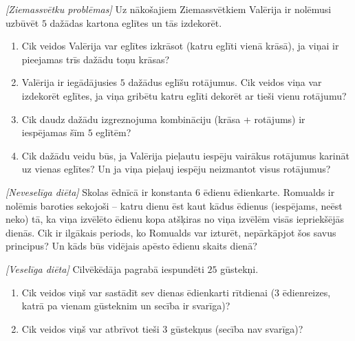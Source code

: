 



\renewcommand{\theenumi}{\alph{enumi}}



\noindent 

\begin{problem}
\textit{[Ziemassvētku problēmas]}
Uz nākošajiem Ziemassvētkiem Valērija ir nolēmusi uzbūvēt $5$ dažādas kartona eglītes un tās izdekorēt.
\begin{enumerate}
\item Cik veidos Valērija var eglītes izkrāsot (katru eglīti vienā krāsā), ja viņai ir pieejamas trīs dažādu toņu krāsas?
\item Valērija ir iegādājusies $5$ dažādus eglīšu rotājumus. Cik veidos viņa var izdekorēt eglītes, ja viņa gribētu katru eglīti dekorēt ar tieši vienu rotājumu?
\item Cik daudz dažādu izgreznojuma kombināciju (krāsa + rotājums) ir iespējamas šīm $5$ eglītēm?
\item Cik dažādu veidu būs, ja Valērija pieļautu iespēju vairākus rotājumus karināt uz vienas eglītes? Un ja viņa pieļauj iespēju neizmantot visus rotājumus?
\end{enumerate}
\end{problem}
%

\begin{problem}
\textit{[Neveselīga diēta]}
Skolas ēdnīcā ir konstanta $6$ ēdienu ēdienkarte. Romualds ir nolēmis baroties sekojoši – katru dienu ēst kaut kādus ēdienus (iespējams, neēst neko) tā, ka viņa izvēlēto ēdienu kopa atšķiras no viņa izvēlēm visās iepriekšējās dienās. 
Cik ir ilgākais periods, ko Romualds var izturēt, nepārkāpjot šos savus principus? Un kāds būs vidējais apēsto ēdienu skaits dienā?
\end{problem}
%

\begin{problem}
\textit{[Veselīga diēta]}
Cilvēkēdāja pagrabā iespundēti $25$ gūstekņi. 
\begin{enumerate}
\item Cik veidos viņš var sastādīt sev dienas ēdienkarti rītdienai ($3$ ēdienreizes, katrā pa vienam gūsteknim un secība ir svarīga)?
\item Cik veidos viņš var atbrīvot tieši $3$ gūstekņus (secība nav svarīga)?
\end{enumerate}

\end{problem}
%

